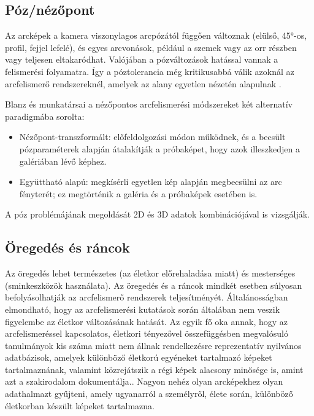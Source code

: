 \subsection{Póz/nézőpont}

Az arcképek a kamera viszonylagos arcpózától függően változnak (elülső, 45°-os, profil, fejjel lefelé), és egyes arcvonások, például a szemek vagy az orr részben vagy teljesen eltakaródhat. Valójában a pózváltozások hatással vannak a felismerési folyamatra. Így a póztolerancia még kritikusabbá válik azoknál az arcfelismerő rendszereknél, amelyek az alany egyetlen nézetén alapulnak \cite{13}.


Blanz és munkatársai \cite{14} a nézőpontos arcfelismerési módszereket két alternatív paradigmába sorolta:  

\begin{itemize}
    \item Nézőpont-transzformált: előfeldolgozási módon működnek, és a becsült pózparaméterek alapján átalakítják a próbaképet, hogy azok illeszkedjen a galériában lévő képhez.
    \item Együttható alapú: megkísérli egyetlen kép alapján megbecsülni az arc fényterét; ez megtörténik a galéria és a próbaképek esetében is.
\end{itemize}

A póz problémájának megoldását 2D és 3D adatok kombinációjával is vizsgálják.


\subsection{Öregedés és ráncok}

Az öregedés lehet természetes (az életkor előrehaladása miatt) és mesterséges (sminkeszközök használata).
Az öregedés és a ráncok mindkét esetben súlyosan befolyásolhatják az arcfelismerő rendszerek teljesítményét. Általánosságban elmondható, hogy az arcfelismerési kutatások során általában nem veszik figyelembe az életkor változásának hatását. Az egyik fő oka annak, hogy az arcfelismeréssel kapcsolatos, életkori tényezővel összefüggésben megvalósuló tanulmányok kis száma miatt nem állnak rendelkezésre reprezentatív nyilvános adatbázisok, amelyek különböző életkorú egyéneket tartalmazó képeket tartalmaznának, valamint közrejátszik a régi képek alacsony minősége is, amint azt a szakirodalom dokumentálja.\cite{15}. Nagyon nehéz olyan arcképekhez olyan adathalmazt gyűjteni, amely ugyanarról a személyről, élete során, különböző életkorban készült képeket tartalmazna.


